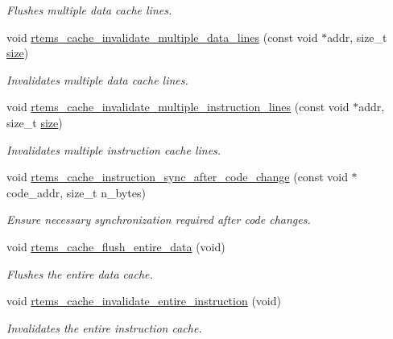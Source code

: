 \begin{DoxyCompactItemize}
\begin{DoxyCompactList}\small\item\em Flushes multiple data cache lines. \end{DoxyCompactList}\item 
void \mbox{\hyperlink{group__ClassicCache_ga96d3bd99324747a1f06348580ffad959}{rtems\+\_\+cache\+\_\+invalidate\+\_\+multiple\+\_\+data\+\_\+lines}} (const void $\ast$addr, size\+\_\+t \mbox{\hyperlink{sun4u_2tte_8h_a245260f6f74972558f61b85227df5aae}{size}})
\begin{DoxyCompactList}\small\item\em Invalidates multiple data cache lines. \end{DoxyCompactList}\item 
void \mbox{\hyperlink{group__ClassicCache_ga49d41da7c95eef43326fe4089c0bab84}{rtems\+\_\+cache\+\_\+invalidate\+\_\+multiple\+\_\+instruction\+\_\+lines}} (const void $\ast$addr, size\+\_\+t \mbox{\hyperlink{sun4u_2tte_8h_a245260f6f74972558f61b85227df5aae}{size}})
\begin{DoxyCompactList}\small\item\em Invalidates multiple instruction cache lines. \end{DoxyCompactList}\item 
void \mbox{\hyperlink{group__ClassicCache_ga5e231667c6314e520fe3d77d64f260ee}{rtems\+\_\+cache\+\_\+instruction\+\_\+sync\+\_\+after\+\_\+code\+\_\+change}} (const void $\ast$code\+\_\+addr, size\+\_\+t n\+\_\+bytes)
\begin{DoxyCompactList}\small\item\em Ensure necessary synchronization required after code changes. \end{DoxyCompactList}\item 
void \mbox{\hyperlink{group__ClassicCache_gad3e610ea873a79c5fa28cc5d945dc2a7}{rtems\+\_\+cache\+\_\+flush\+\_\+entire\+\_\+data}} (void)
\begin{DoxyCompactList}\small\item\em Flushes the entire data cache. \end{DoxyCompactList}\item 
void \mbox{\hyperlink{group__ClassicCache_ga1d5715f6a5804efb59557f9e7f46abf5}{rtems\+\_\+cache\+\_\+invalidate\+\_\+entire\+\_\+instruction}} (void)
\begin{DoxyCompactList}\small\item\em Invalidates the entire instruction cache. \end{DoxyCompactList}\item 

\end{DoxyCompactItemize}
